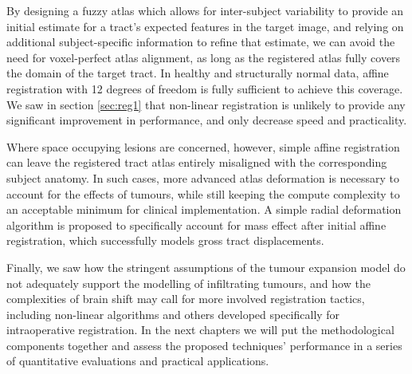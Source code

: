 By designing a fuzzy atlas which allows for inter-subject variability to provide an initial estimate for a tract's expected features in the target image, and relying on additional subject-specific information to refine that estimate, we can avoid the need for voxel-perfect atlas alignment, as long as the registered atlas fully covers the domain of the target tract.
In healthy and structurally normal data, affine registration with 12 degrees of freedom is fully sufficient to achieve this coverage.
We saw in section \ref{sec:reg1} that non-linear registration is unlikely to provide any significant improvement in performance, and only decrease speed and practicality.

Where space occupying lesions are concerned, however, simple affine registration can leave the registered tract atlas entirely misaligned with the corresponding subject anatomy.
In such cases, more advanced atlas deformation is necessary to account for the effects of tumours, while still keeping the compute complexity to an acceptable minimum for clinical implementation.
A simple radial deformation algorithm is proposed to specifically account for mass effect after initial affine registration, which successfully models gross tract displacements.

Finally, we saw how the stringent assumptions of the tumour expansion model do not adequately support the modelling of infiltrating tumours, and how the complexities of brain shift may call for more involved registration tactics, including non-linear algorithms and others developed specifically for intraoperative registration.
In the next chapters we will put the methodological components together and assess the proposed techniques' performance in a series of quantitative evaluations and practical applications.
